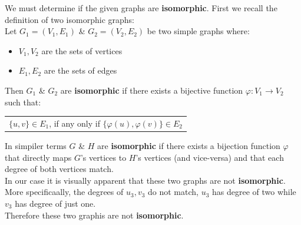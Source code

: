 \documentclass[11pt]{article}
\begin{document}
We must determine if the given graphs are \textbf{isomorphic}.
First we recall the definition of two isomorphic graphs: \\

Let \(G_1 = (V_1,E_1)\) \& \(G_2 = (V_2, E_2)\) be two simple graphs where:
\begin{itemize}
\item \(V_1, V_2\) are the sets of vertices
\item \(E_1, E_2\) are the sets of edges
\end{itemize}

Then \(G_1\) \& \(G_2\) are \textbf{isomorphic} if there exists a bijective function \(\varphi : V_1 \rightarrow V_2\) such that:
\begin{center}
\begin{tabular}{l}
\(\{u, v\} \in E_1\), if any only if \(\{\varphi\left(u\right), \varphi\left(v\right)\} \in E_2\)\\
\end{tabular}
\end{center}

In simpiler terms \(G\) \& \(H\) are \textbf{isomorphic} if there exists a bijection function \(\varphi\) that directly maps \(G\)'s vertices to \(H\)'s vertices (and vice-versa) and that each degree of both vertices match. \\

In our case it is visually apparent that these two graphs are not \textbf{isomorphic}.
More specificaally, the degrees of \(u_3, v_3\) do not match, \(u_3\) has degree of two while \(v_3\) has degree of just one. \\
Therefore these two graphis are not \textbf{isomorphic}.
\end{document}
